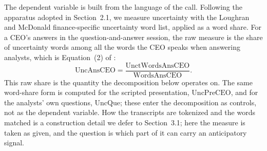 
The dependent variable is built from the language of the call. Following the apparatus adopted in Section~2.1, we measure uncertainty with the Loughran and McDonald finance-specific uncertainty word list, applied as a word share. For a CEO's answers in the question-and-answer session, the raw measure is the share of uncertainty words among all the words the CEO speaks when answering analysts, which is Equation~(2) of \citet{dwz}:
\begin{equation}
\mathrm{UncAnsCEO} = \frac{\mathrm{UnctWordsAnsCEO}}{\mathrm{WordsAnsCEO}}.
\end{equation}
This raw share is the quantity the decomposition below operates on. The same word-share form is computed for the scripted presentation, $\mathrm{UncPreCEO}$, and for the analysts' own questions, $\mathrm{UncQue}$; these enter the decomposition as controls, not as the dependent variable. How the transcripts are tokenized and the words matched is a construction detail we defer to Section~3.1; here the measure is taken as given, and the question is which part of it can carry an anticipatory signal.

